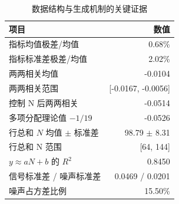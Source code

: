 \begin{table}[htbp]
\centering
\caption{数据结构与生成机制的关键证据}
\label{tab:structure}
\small
\begin{tabular}{lr}
\toprule
项目 & 数值 \\
\midrule
指标均值极差/均值 & 0.68\% \\
指标标准差极差/均值 & 2.02\% \\
两两相关均值 & -0.0104 \\
两两相关范围 & [-0.0167, -0.0056] \\
控制 N 后两两相关 & -0.0514 \\
多项分配理论值 $-1/19$ & -0.0526 \\
行总和 $N$ 均值 $\pm$ 标准差 & 98.79 $\pm$ 8.31 \\
行总和 N 范围 & [64, 144] \\
$y\approx aN+b$ 的 $R^2$ & 0.8450 \\
信号标准差 / 噪声标准差 & 0.0469 / 0.0201 \\
噪声占方差比例 & 15.50\% \\
\bottomrule
\end{tabular}
\end{table}
